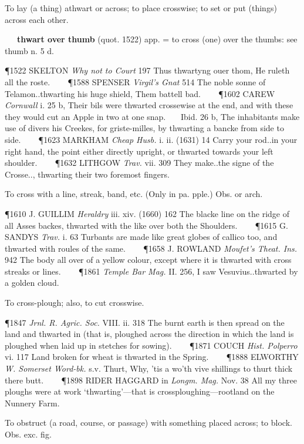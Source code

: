 \begin{description}[wide, labelwidth=!, labelindent=0pt]
\begin{myenumerate}
 To lay (a thing) athwart or across; to place crosswise; to set or put (things) across each other.

   \textbf{thwart over thumb} (quot. 1522) app. = to cross (one) over the thumbs: see thumb n. 5 d.

\P 1522 SKELTON  \textit{Why not to Court} 197 Thus thwartyng ouer thom, He ruleth all the roste.    
\P 1588 SPENSER  \textit{Virgil's Gnat} 514 The noble sonne of Telamon..thwarting his huge shield, Them battell bad.    
\P 1602 CAREW  \textit{Cornwall} i. 25 b, Their bils were thwarted crossewise at the end, and with these they would cut an Apple in two at one snap.    Ibid. 26 b, The inhabitants make use of divers his Creekes, for griste-milles, by thwarting a bancke from side to side.    
\P 1623 MARKHAM  \textit{Cheap Husb.} i. ii. (1631) 14 Carry your rod..in your right hand, the point either directly upright, or thwarted towards your left shoulder.    
\P 1632 LITHGOW  \textit{Trav.} vii. 309 They make..the signe of the Crosse.., thwarting their two foremost fingers.

 To cross with a line, streak, band, etc. (Only in pa. pple.) Obs. or arch.

\P 1610 J. GUILLIM  \textit{Heraldry} iii. xiv. (1660) 162 The blacke line on the ridge of all Asses backes, thwarted with the like over both the Shoulders.    
\P 1615 G. SANDYS  \textit{Trav.} i. 63 Turbants are made like great globes of callico too, and thwarted with roules of the same.    
\P 1658 J. ROWLAND  \textit{Moufet's Theat. Ins.} 942 The body all over of a yellow colour, except where it is thwarted with cross streaks or lines.    
\P 1861 \textit{Temple  Bar Mag.} II. 256, I saw Vesuvius..thwarted by a golden cloud.

 To cross-plough; also, to cut crosswise.

\P 1847 \textit{Jrnl.  R. Agric. Soc.} VIII. ii. 318 The burnt earth is then spread on the land and thwarted in (that is, ploughed across the direction in which the land is ploughed when laid up in stetches for sowing).    
\P 1871 COUCH  \textit{Hist. Polperro} vi. 117 Land broken for wheat is thwarted in the Spring.    
\P 1888 ELWORTHY  \textit{W. Somerset Word-bk.} s.v. Thurt, Why, 'tis a wo'th vive shillings to thurt thick there butt.    
\P 1898 RIDER HAGGARD in  \textit{Longm. Mag.} Nov. 38 All my three ploughs were at work ‘thwarting’—that is crossploughing—rootland on the Nunnery Farm.

 To obstruct (a road, course, or passage) with something placed across; to block. Obs. exc. fig.


\end{myenumerate}
\end{description}
